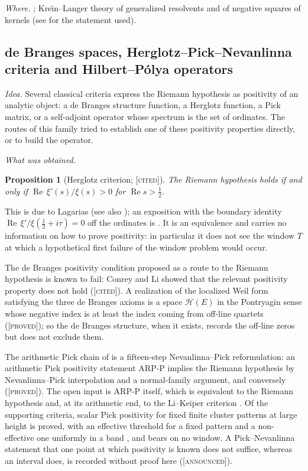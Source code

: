 \documentclass[11pt]{amsart}
\newtheorem{proposition}[theorem]{Proposition}
\theoremstyle{definition}
\theoremstyle{remark}
\numberwithin{equation}{section}
\DeclareMathOperator{\Rel}{Re}
\newcommand{\stag}[1]{\textsc{[#1]}}
\newcommand{\PROVED}{\stag{proved}}
\newcommand{\CITED}{\stag{cited}}
\newcommand{\ANNOUNCED}{\stag{announced}}
\newcommand{\entry}[1]{\par\smallskip\noindent\textit{#1.}\enspace}
\begin{document}
\entry{Where} \cite{P08,P11,P18,P25,P35}; Kre\u{\i}n--Langer theory of generalized resolvents and of
negative squares of kernels (see \cite{P35} for the statement used).

\subsection{de Branges spaces, Herglotz--Pick--Nevanlinna criteria and Hilbert--P\'olya operators}
\label{w6:fam:R11}

\entry{Idea} Several classical criteria express the Riemann hypothesis as positivity of an analytic
object: a de Branges structure function, a Herglotz function, a Pick matrix, or a self-adjoint
operator whose spectrum is the set of ordinates. The routes of this family tried to establish one
of these positivity properties directly, or to build the operator.

\entry{What was obtained}
\begin{proposition}[Herglotz criterion; \CITED]\label{w6:prop:herglotz}
The Riemann hypothesis holds if and only if $\Rel\,\xi'(s)/\xi(s)>0$ for $\Rel s>\frac12$.
\end{proposition}
This is due to Lagarias \cite{Lagarias1999} (see also \cite{Hinkkanen1997}); an exposition with the
boundary identity $\Rel\,\xi'/\xi(\frac12+i\tau)=0$ off the ordinates is \cite[Proposition~2.1 and
Theorem~3.1]{P20}. It is an equivalence and carries no information on how to prove positivity: in
particular it does not see the window $T$ at which a hypothetical first failure of the window
problem would occur.

The de Branges positivity condition proposed as a route to the Riemann hypothesis is known to fail:
Conrey and Li \cite{ConreyLi2000} showed that the relevant positivity property does not hold
(\CITED). A realization of the localized Weil form satisfying the three de Branges axioms is a
space $\mathcal H(E)$ in the Pontryagin sense whose negative index is at least the index coming
from off-line quartets \cite[Theorem~8.4]{P18} (\PROVED); so the de Branges structure, when it
exists, records the off-line zeros but does not exclude them.

The arithmetic Pick chain of \cite{P36} is a fifteen-step Nevanlinna--Pick reformulation: an
arithmetic Pick positivity statement ARP-P implies the Riemann hypothesis by Nevanlinna--Pick
interpolation and a normal-family argument, and conversely
\cite[Theorems~9.241 and 9.245, Corollary~9.246]{P36} (\PROVED). The open input is ARP-P itself,
which is equivalent to the Riemann hypothesis and, at its arithmetic end, to the Li--Keiper
criterion \cite[Corollary~9.247]{P36}. Of the supporting criteria, scalar Pick positivity for fixed
finite cluster patterns at large height is proved, with an effective threshold for a fixed pattern \cite[Theorem~9.43]{P36} and a
non-effective one uniformly in a band \cite[Theorem~9.64]{P36}, and bears on no window. A Pick--Nevanlinna statement that one point at which
positivity is known does not suffice, whereas an interval does, is recorded without proof here
(\ANNOUNCED).
\end{document}
